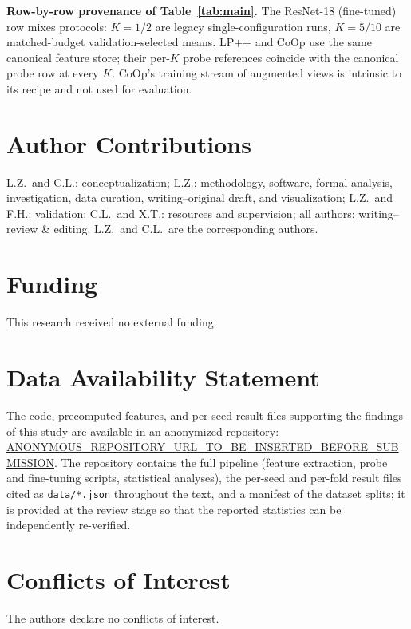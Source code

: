 \documentclass[10pt,a4paper]{article}
\begin{document}
\textbf{Row-by-row provenance of Table~\ref{tab:main}.} The ResNet-18 (fine-tuned) row mixes protocols: $K{=}1/2$ are legacy single-configuration runs, $K{=}5/10$ are matched-budget validation-selected means. LP++ and CoOp use the same canonical feature store; their per-$K$ probe references coincide with the canonical probe row at every $K$. CoOp's training stream of augmented views is intrinsic to its recipe and not used for evaluation.



\section*{Author Contributions}
L.Z.\ and C.L.: conceptualization; L.Z.: methodology, software, formal analysis, investigation, data curation, writing--original draft, and visualization; L.Z.\ and F.H.: validation; C.L.\ and X.T.: resources and supervision; all authors: writing--review \& editing. L.Z.\ and C.L.\ are the corresponding authors.
\section*{Funding}
This research received no external funding.
\section*{Data Availability Statement}
The code, precomputed features, and per-seed result files supporting the findings of this study are available in an anonymized repository: \url{ANONYMOUS_REPOSITORY_URL_TO_BE_INSERTED_BEFORE_SUBMISSION}. The repository contains the full pipeline (feature extraction, probe and fine-tuning scripts, statistical analyses), the per-seed and per-fold result files cited as \texttt{data/*.json} throughout the text, and a manifest of the dataset splits; it is provided at the review stage so that the reported statistics can be independently re-verified.
\section*{Conflicts of Interest}
The authors declare no conflicts of interest.
\end{document}
